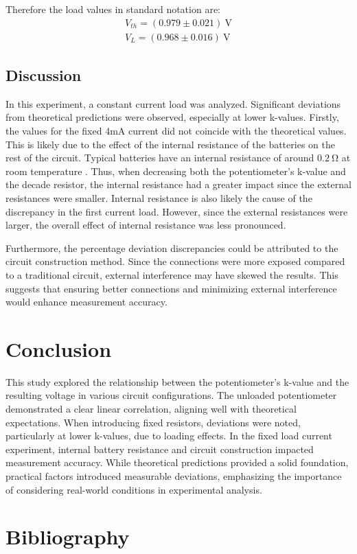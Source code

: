 \documentclass[a4paper]{article}
\newcommand{\unit}[1]{~\mathrm{#1}}
\begin{document}
Therefore the load values in standard notation are:
\begin{gather*}
    V_{th} = (0.979 \pm 0.021)\unit{V}\\
    V_L = (0.968 \pm 0.016)\unit{V}
\end{gather*}
\subsection{Discussion}
In this experiment, a constant current load was analyzed.
Significant deviations from theoretical predictions were observed, especially at lower k-values. 
Firstly, the values for the fixed 4mA current did not coincide with the theoretical values. 
This is likely due to the effect of the internal resistance of the batteries on the rest of the circuit. 
Typical batteries have an internal resistance of around $0.2 \unit{\Omega}$ at room temperature \cite{ir}. 
Thus, when decreasing both the potentiometer's k-value and the decade resistor, 
the internal resistance had a greater impact since the external resistances were smaller.
Internal resistance is also likely the cause of the discrepancy in the first current load. 
However, since the external resistances were larger, the overall effect of internal resistance was less pronounced.

Furthermore, the percentage deviation discrepancies could be attributed to the circuit construction method. 
Since the connections were more exposed compared to a traditional circuit, 
external interference may have skewed the results. 
This suggests that ensuring better connections and minimizing external interference would enhance measurement accuracy.
\section{Conclusion}
This study explored the relationship between the potentiometer's k-value and the resulting voltage in various circuit configurations. 
The unloaded potentiometer demonstrated a clear linear correlation, aligning well with theoretical expectations.
When introducing fixed resistors, deviations were noted, particularly at lower k-values, due to loading effects. 
In the fixed load current experiment, internal battery resistance and circuit construction impacted measurement accuracy. 
While theoretical predictions provided a solid foundation, practical factors introduced measurable deviations, 
emphasizing the importance of considering real-world conditions in experimental analysis.
\section{Bibliography}


\end{document}
